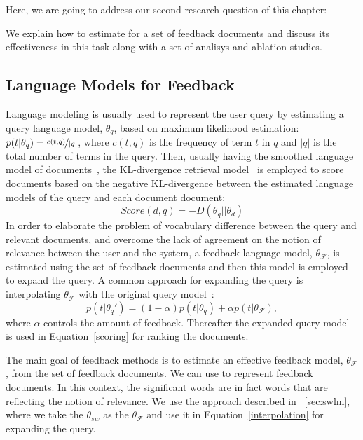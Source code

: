 Here, we are going to address our second research question of this chapter: 
\begin{resqbox}
\emph{}
\end{resqbox}
We explain how to estimate \acswlm for a set of feedback documents and discuss its effectiveness in this task along with a set of analisys and ablation studies.

\subsection{Language Models for Feedback}
Language modeling is usually used to represent the user query by estimating a query language model, $\theta_q$, based on maximum likelihood estimation:
$p(t|\theta_q)=\nicefrac{c(t,q)}{|q|}$, 
where $c(t,q)$ is the frequency of term $t$ in $q$ and $|q|$ is the total number of terms in the query.
Then, usually having the smoothed language model of documents~\citep{Zhai:2001}, the KL-divergence retrieval model~\citep{Lafferty:2001} is employed to score documents based on the negative KL-divergence between the estimated language models of the query and each document document:
\begin{equation}
Score(d,q) = -D(\theta_q||\theta_d)
\label{scoring}
\end{equation}
In order to elaborate the problem of vocabulary difference between the query and relevant documents, and overcome the lack of agreement on the notion of relevance between the user and the system, a feedback language model, $\theta_\mathcal{F}$,  is estimated using the set of feedback documents and then this model is employed to expand the query. A common approach for expanding the query is interpolating $\theta_\mathcal{F}$ with the original query model~\cite{Zhai:SMM:2001,Abdul-jaleel:2004}:
\begin{equation}
p(t|\theta_{q}') = (1-\alpha)p(t|\theta_q)+\alpha p(t|\theta_\mathcal{F}),
\label{interpolation}
\end{equation}
where $\alpha$ controls the amount of feedback. Thereafter the expanded query model is used in Equation~\ref{scoring} for ranking the documents.

The main goal of feedback methods is to estimate an effective feedback model, $\theta_\mathcal{F}$, from the set of feedback documents. 
We can use \swlms to represent feedback documents. In this context, the significant words are in fact words that are reflecting the notion of relevance. We use the approach described in ~\ref{sec:swlm}, where we take the $\theta_{sw}$ as the $\theta_\mathcal{F}$  and use it in Equation~\ref{interpolation} for expanding the query. 

